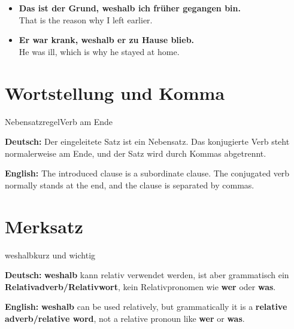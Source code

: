 \documentclass[a4paper,11pt]{article}
\newcommand{\GermanText}[1]{\textbf{Deutsch: }#1\par}
\newcommand{\EnglishText}[1]{{\small\color{SoftGray}\textbf{English: }#1\par}}
\newcommand{\ExampleItem}[2]{\item \textbf{#1}\\{\small\color{SoftGray}#2}}
\begin{document}
\begin{exbox}

\begin{itemize}

\ExampleItem{Das ist der Grund, weshalb ich früher gegangen bin.}{That is the reason why I left earlier.}

\ExampleItem{Er war krank, weshalb er zu Hause blieb.}{He was ill, which is why he stayed at home.}

\end{itemize}

\end{exbox}

\section{Wortstellung und Komma}

\begin{grammarentry}{Nebensatzregel}{Verb am Ende}

\GermanText{Der eingeleitete Satz ist ein Nebensatz. Das konjugierte Verb steht normalerweise am Ende, und der Satz wird durch Kommas abgetrennt.}

\EnglishText{The introduced clause is a subordinate clause. The conjugated verb normally stands at the end, and the clause is separated by commas.}

\end{grammarentry}

\section{Merksatz}

\begin{grammarentry}{weshalb}{kurz und wichtig}

\GermanText{\textbf{weshalb} kann relativ verwendet werden, ist aber grammatisch ein \textbf{Relativadverb/Relativwort}, kein Relativpronomen wie \textbf{wer} oder \textbf{was}.}

\EnglishText{\textbf{weshalb} can be used relatively, but grammatically it is a \textbf{relative adverb/relative word}, not a relative pronoun like \textbf{wer} or \textbf{was}.}

\end{grammarentry}
\end{document}
